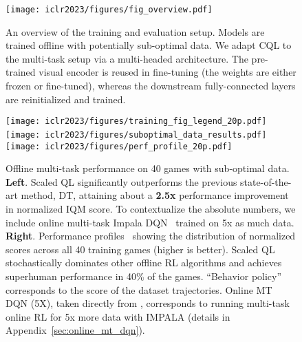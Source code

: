 \begin{figure}[t]
    \centering
    \texttt{[image: iclr2023/figures/fig\_overview.pdf]}
    \vspace{-0.3cm}
    \caption{\footnotesize{An overview of the training and evaluation setup. Models are trained offline with potentially sub-optimal data. We adapt CQL to the multi-task setup via a multi-headed architecture. The pre-trained visual encoder is reused in fine-tuning (the weights are either frozen or fine-tuned), whereas the downstream fully-connected layers are reinitialized and trained.}}
    \label{fig:overview}
    \vspace{-0.5cm}
\end{figure}


\vspace{-0.1cm}
\begin{figure}[t]
    \centering
    \texttt{[image: iclr2023/figures/training\_fig\_legend\_20p.pdf]}
    \vspace{-0.1cm}
    \texttt{[image: iclr2023/figures/suboptimal\_data\_results.pdf]}
    ~~~
    \texttt{[image: iclr2023/figures/perf\_profile\_20p.pdf]}
    \vspace{-0.3cm}
    \caption{\footnotesize{Offline multi-task performance on 40 games with sub-optimal data. \textbf{Left}. Scaled QL significantly outperforms the previous state-of-the-art method, DT, attaining about a \textbf{2.5x} performance improvement in normalized IQM score. To contextualize the absolute numbers, we include online multi-task Impala DQN~\citep{espeholt2018impala} trained on 5x as much data.
    \textbf{Right}. Performance profiles~\citep{agarwal2021deep} showing the distribution of normalized scores across all 40 training games (higher is better). 
    Scaled QL stochastically dominates other offline RL algorithms and achieves superhuman performance in 40\% of the games. ``Behavior policy'' corresponds to the score of the dataset trajectories. {Online MT DQN (5X), taken directly from \citet{lee2022multi}, corresponds to running multi-task online RL for 5x more data with IMPALA (details in Appendix~\ref{sec:online_mt_dqn}).}}}
    \label{fig:suboptimal_offline}
    \vspace{-0.3cm}
\end{figure}
